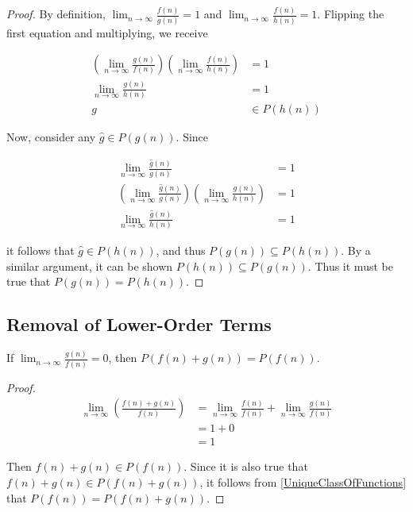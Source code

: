 \begin{proof}
	By definition, $\lim_{n \to \infty} \frac{f(n)}{g(n)} = 1$ and $\lim_{n \to \infty} \frac{f(n)}{h(n)} = 1$. Flipping the first equation and multiplying, we receive
	
	\begin{align*}
	\left( \lim_{n \to \infty} \frac {g(n)} {f(n)} \right) \left( \lim_{n \to \infty} \frac {f(n)} {h(n)} \right) &= 1\\
	\lim_{n \to \infty} \frac {g(n)} {h(n)} &= 1\\
	g &\in P(h(n))
	\end{align*}
	
	Now, consider any $\hat{g} \in P(g(n))$. Since
	
	\begin{align*}
	\lim_{n \to \infty} \frac {\hat{g}(n)} {g(n)} &= 1\\
	\left( \lim_{n \to \infty} \frac {\hat{g}(n)} {g(n)} \right) \left( \lim_{n \to \infty} \frac{g(n)}{h(n)} \right) &= 1\\
	\lim_{n \to \infty} \frac{\hat{g}(n)}{h(n)} &= 1
	\end{align*}
	
	it follows that $\hat{g} \in P(h(n))$, and thus $P(g(n)) \subseteq P(h(n))$. By a similar argument, it can be shown $P(h(n)) \subseteq P(g(n))$. Thus it must be true that $P(g(n)) = P(h(n))$.
\end{proof}

\subsection{Removal of Lower-Order Terms}
\label{RemovesLowerOrderTerms}

\begin{theorem}
	If $\lim_{n \to \infty} \frac{g(n)}{f(n)} = 0$, then $P(f(n) + g(n)) = P(f(n))$.
\end{theorem}

\begin{proof}
	\begin{align*}
	\lim_{n \to \infty} \left( \frac{f(n) + g(n)}{f(n)} \right) &= \lim_{n \to \infty} \frac{f(n)}{f(n)} + \lim_{n \to \infty} \frac{g(n)}{f(n)}\\
	&= 1 + 0\\
	&= 1
	\end{align*}
	
	Then $f(n) + g(n) \in P(f(n))$. Since it is also true that $f(n) + g(n) \in P(f(n) + g(n))$, it follows from \ref{UniqueClassOfFunctions} that $P(f(n)) = P(f(n) + g(n))$.
\end{proof}